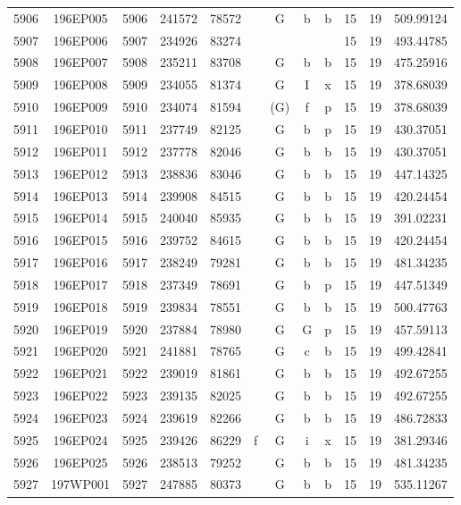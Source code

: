 \begin{tabular}{|*{12}{c|}}
5906 & 196EP005 & 5906 & 241572 & 78572 &  & G & b & b & 15 & 19 & 509.99124 \\ 
5907 & 196EP006 & 5907 & 234926 & 83274 &  &  &  &  & 15 & 19 & 493.44785 \\ 
5908 & 196EP007 & 5908 & 235211 & 83708 &  & G & b & b & 15 & 19 & 475.25916 \\ 
5909 & 196EP008 & 5909 & 234055 & 81374 &  & G & I & x & 15 & 19 & 378.68039 \\ 
5910 & 196EP009 & 5910 & 234074 & 81594 &  & (G) & f & p & 15 & 19 & 378.68039 \\ 
5911 & 196EP010 & 5911 & 237749 & 82125 &  & G & b & p & 15 & 19 & 430.37051 \\ 
5912 & 196EP011 & 5912 & 237778 & 82046 &  & G & b & b & 15 & 19 & 430.37051 \\ 
5913 & 196EP012 & 5913 & 238836 & 83046 &  & G & b & b & 15 & 19 & 447.14325 \\ 
5914 & 196EP013 & 5914 & 239908 & 84515 &  & G & b & b & 15 & 19 & 420.24454 \\ 
5915 & 196EP014 & 5915 & 240040 & 85935 &  & G & b & b & 15 & 19 & 391.02231 \\ 
5916 & 196EP015 & 5916 & 239752 & 84615 &  & G & b & b & 15 & 19 & 420.24454 \\ 
5917 & 196EP016 & 5917 & 238249 & 79281 &  & G & b & b & 15 & 19 & 481.34235 \\ 
5918 & 196EP017 & 5918 & 237349 & 78691 &  & G & b & p & 15 & 19 & 447.51349 \\ 
5919 & 196EP018 & 5919 & 239834 & 78551 &  & G & b & b & 15 & 19 & 500.47763 \\ 
5920 & 196EP019 & 5920 & 237884 & 78980 &  & G & G & p & 15 & 19 & 457.59113 \\ 
5921 & 196EP020 & 5921 & 241881 & 78765 &  & G & c & b & 15 & 19 & 499.42841 \\ 
5922 & 196EP021 & 5922 & 239019 & 81861 &  & G & b & b & 15 & 19 & 492.67255 \\ 
5923 & 196EP022 & 5923 & 239135 & 82025 &  & G & b & b & 15 & 19 & 492.67255 \\ 
5924 & 196EP023 & 5924 & 239619 & 82266 &  & G & b & b & 15 & 19 & 486.72833 \\ 
5925 & 196EP024 & 5925 & 239426 & 86229 & f & G & i & x & 15 & 19 & 381.29346 \\ 
5926 & 196EP025 & 5926 & 238513 & 79252 &  & G & b & b & 15 & 19 & 481.34235 \\ 
5927 & 197WP001 & 5927 & 247885 & 80373 &  & G & b & b & 15 & 19 & 535.11267 \\ 

\end{tabular}
